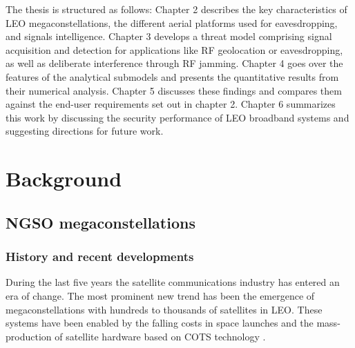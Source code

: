 \documentclass[english, 12pt, a4paper, elec, utf8, a-1b, online]{aaltothesis}
\begin{document}
The thesis is structured as follows:
Chapter 2 describes the key characteristics of LEO megaconstellations, the different aerial platforms used for eavesdropping, and signals intelligence.
Chapter 3 develops a threat model comprising signal acquisition and detection for applications like RF geolocation or eavesdropping, as well as deliberate interference through RF jamming.
Chapter 4 goes over the features of the analytical submodels and presents the quantitative results from their numerical analysis.
Chapter 5 discusses these findings and compares them against the end-user requirements set out in chapter 2.
Chapter 6 summarizes this work by discussing the security performance of LEO broadband systems and suggesting directions for future work.

\clearpage

\section{Background}

\subsection{NGSO megaconstellations}
\subsubsection{History and recent developments}
During the last five years the satellite communications industry has entered an era of change.
The most prominent new trend has been the emergence of megaconstellations with hundreds to thousands of satellites in LEO.
These systems have been enabled by the falling costs in space launches and the mass-production of satellite hardware based on COTS technology \cite{portillo2019technical}.
\end{document}
